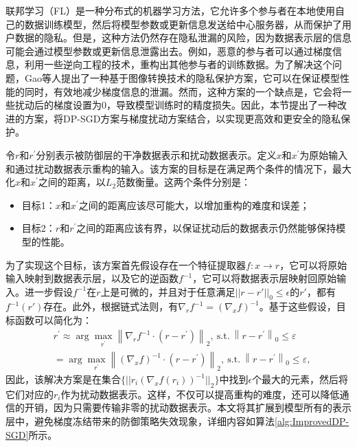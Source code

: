 联邦学习（FL）是一种分布式的机器学习方法，它允许多个参与者在本地使用自己的数据训练模型，然后将模型参数或更新信息发送给中心服务器，从而保护了用户数据的隐私。但是，这种方法仍然存在隐私泄漏的风险，因为数据表示层的信息可能会通过模型参数或更新信息泄露出去\cite{Soteria}。例如，恶意的参与者可以通过梯度信息，利用一些逆向工程的技术，重构出其他参与者的训练数据。为了解决这个问题，Gao等人\cite{Automatic_Transformation_Search_Against_Deep_Leakage_From_Gradients}提出了一种基于图像转换技术的隐私保护方案，它可以在保证模型性能的同时，有效地减少梯度信息的泄漏。然而，这种方案的一个缺点是，它会将一些扰动后的梯度设置为0，导致模型训练时的精度损失。因此，本节提出了一种改进的方案，将DP-SGD方案与梯度扰动方案结合，以实现更高效和更安全的隐私保护。

令$r$和$r^{\prime}$分别表示被防御层的干净数据表示和扰动数据表示。定义$x$和$x^{\prime}$为原始输入和通过扰动数据表示重构的输入。该方案的目标是在满足两个条件的情况下，最大化$x$和$x^{\prime}$之间的距离，以$L_2$范数衡量。这两个条件分别是：
\begin{itemize}
\item 目标1：$x$和$x^{\prime}$之间的距离应该尽可能大，以增加重构的难度和误差；
\item 目标2：$r$和$r^{\prime}$之间的距离应该有界，以保证扰动后的数据表示仍然能够保持模型的性能。
\end{itemize}
为了实现这个目标，该方案首先假设存在一个特征提取器$f:x\rightarrow r$，它可以将原始输入映射到数据表示层，以及它的逆函数$f^{-1}$，它可以将数据表示层映射回原始输入。进一步假设$f^{-1}$在$r$上是可微的，并且对于任意满足$||r-r'||_0\leq\epsilon$的$r'$，都有$f^{-1}(r')$存在。此外，根据链式法则，有$\nabla_{r}f^{-1}=(\nabla_{x}f)^{-1}$。基于这些假设，目标函数可以简化为：
\begin{equation}\begin{aligned}
&r^{\prime}\approx\arg\max_{r^{\prime}}\left\|\nabla_rf^{-1}\cdot(r-r^{\prime})\right\|_2,\mathrm{~s.t.~}\left\|r-r^{\prime}\right\|_0\leq\varepsilon\\
&=\arg\max_{r^{\prime}}\left\|\left(\nabla_xf\right)^{-1}\cdot\left(r-r^{\prime}\right)\right\|_2,\mathrm{~s.t.~}\left\|r-r^{\prime}\right\|_0\leq\varepsilon,
\end{aligned}\end{equation}
因此，该解决方案是在集合$\{||r_i(\nabla_xf(r_i))^{-1}||_2\}$中找到$\epsilon$个最大的元素，然后将它们对应的$r_i$作为扰动数据表示。这样，不仅可以提高重构的难度，还可以降低通信的开销，因为只需要传输非零的扰动数据表示。本文将其扩展到模型所有的表示层中，避免梯度冻结带来的防御策略失效现象，详细内容如算法\ref{alg:ImprovedDP-SGD}所示。

